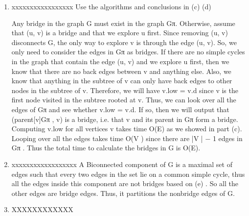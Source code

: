 \documentclass[paper=a4, fontsize=11pt]{scrartcl} %
\numberwithin{equation}{section} %
\numberwithin{figure}{section} %
\numberwithin{table}{section} %
\begin{document}
\begin{enumerate}[label={2.(\alph*)}]
  \item xxxxxxxxxxxxxxxxx
Use the algorithms and conclusions in (c)  (d)

Any bridge in the graph G must exist in the graph Gπ. Otherwise, assume that (u, v) is a bridge and that we explore u first. Since removing (u, v) disconnects G, the only way to explore v is through the edge (u, v). So, we only need to consider the edges in Gπ as bridges. If there are no simple cycles in the graph that contain the edge (u, v) and we explore u first, then we know that there are no back edges between v and anything else. Also, we know that anything
in the subtree of v can only have back edges to other nodes in the subtree of v. Therefore, we will have v.low = v.d since v is the first node visited in the subtree rooted at v. Thus, we can look over all the edges of Gπ and see whether v.low = v.d. If so, then we will output that (parent[v]Gπ , v) is a bridge, i.e. that v and its parent in Gπ form a bridge. Computing v.low for all vertices v takes time O(E) as we showed in part (c). Looping over all the edges takes time O(V ) since there are |V | − 1 edges in Gπ . Thus the total time to calculate the bridges in G is O(E).


  \item xxxxxxxxxxxxxxxxxx
A  Biconnected component of G is a maximal set of edges such that every two edges in the set lie on a common simple cycle, thus all the edges inside this component are not bridges based on (e) .
So all the other edges are bridge edges. Thus, it partitions the nonbridge edges of G.

  \item XXXXXXXXXXXX

\end{enumerate}


\end{document}
